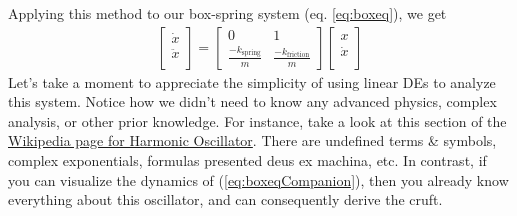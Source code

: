 \documentclass[11pt, oneside]{article}   	%
\begin{document}
Applying this method to our box-spring system (eq. \ref{eq:boxeq}), we get
\begin{align} \label{eq:boxeqCompanion}
\begin{bmatrix}
        \dot{x} \\
        \ddot{x} \\
      \end{bmatrix}
  =
      \begin{bmatrix}
        0 & 1 \\
        \frac{-k_\mathrm{spring}}{m} & \frac{-k_\mathrm{friction}}{m}
      \end{bmatrix}
      \begin{bmatrix}
        x \\
        \dot{x} \\
      \end{bmatrix}
\end{align}
Let's take a moment to appreciate the simplicity of using linear DEs to analyze this system.
Notice how we didn't need to know any advanced physics, complex analysis, or other prior knowledge.
For instance, take a look at this section of the \href{https://en.wikipedia.org/wiki/Harmonic_oscillator#Universal_oscillator_equation}{Wikipedia page for Harmonic Oscillator}.
There are undefined terms \& symbols, complex exponentials, formulas presented deus ex machina, etc.
In contrast, if you can visualize the dynamics of (\ref*{eq:boxeqCompanion}),
then you already know everything about this oscillator, and can consequently derive the cruft.
\end{document}
